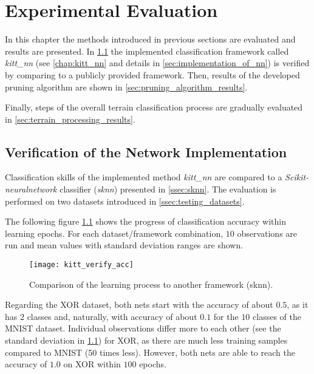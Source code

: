 \chapter{Experimental Evaluation} \label{chap:results}
In this chapter the methods introduced in previous sections are evaluated and results are presented. In \cref{sec:verification_of_nn} the implemented classification framework called \textit{kitt\_nn} (see \cref{chap:kitt_nn} and details in \cref{sec:implementation_of_nn}) is verified by comparing to a publicly provided framework. Then, results of the developed pruning algorithm are shown in \cref{sec:pruning_algorithm_results}.

Finally, steps of the overall terrain classification process are gradually evaluated in \cref{sec:terrain_processing_results}.

\section{Verification of the Network Implementation} \label{sec:verification_of_nn}
Classification skills of the implemented method \textit{kitt\_nn} are compared to a \textit{Scikit-neuralnetwork} classifier (\textit{sknn}) presented in \cref{ssec:sknn}. The evaluation is performed on two datasets introduced in \cref{ssec:testing_datasets}.

The following figure \ref{fig:kitt_verify_acc} shows the progress of classification accuracy within learning epochs. For each dataset/framework combination, $ 10 $ observations are run and mean values with standard deviation ranges are shown.

\begin{figure}[H]
  \centering
  \texttt{[image: kitt\_verify\_acc]}
  \caption{Comparison of the learning process to another framework (sknn).}
  \label{fig:kitt_verify_acc}
\end{figure}

Regarding the XOR dataset, both nets start with the accuracy of about $ 0.5 $, as it has $ 2 $ classes and, naturally, with accuracy of about $ 0.1 $ for the $ 10 $ classes of the MNIST dataset. Individual observations differ more to each other (see the standard deviation in \cref{fig:kitt_verify_acc}) for XOR, as there are much less training samples compared to MNIST (50 times less). However, both nets are able to reach the accuracy of $ 1.0 $ on XOR within $ 100 $ epochs.


